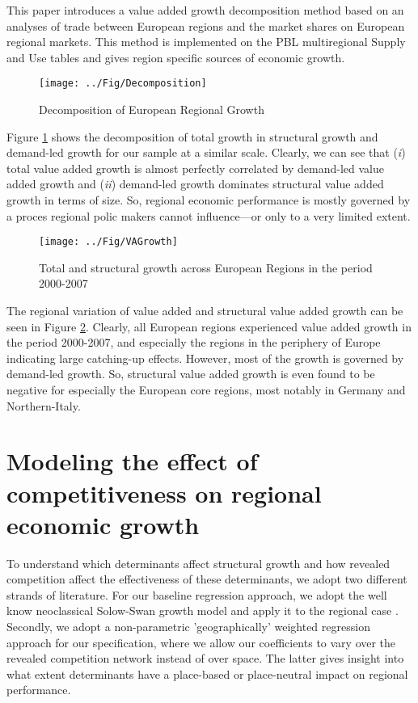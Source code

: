 \documentclass[11pt,parskip,abstracton,notitlepage, paper=a4]{scrartcl}
\begin{document}
This paper introduces a value added growth decomposition method based on an analyses of trade between European regions and the market shares on European regional markets. This method is implemented on the PBL multiregional Supply and Use tables \citep{Thissen2013b, Thissen2013} and gives region specific sources of economic growth. 

\begin{figure}
	\texttt{[image: ../Fig/Decomposition]}
	\caption{Decomposition of European Regional Growth}
	\label{fig:decomposition}
\end{figure}

Figure \ref{fig:decomposition} shows the decomposition of total growth in structural growth and demand-led growth for our sample at a similar scale. Clearly, we can see that (\textit{i}) total value added growth is almost perfectly correlated by demand-led value added growth and (\textit{ii}) demand-led growth dominates structural value added growth in terms of size. So, regional economic performance is mostly governed by a proces regional polic makers cannot influence---or only to a very limited extent. 

\begin{figure}
	\texttt{[image: ../Fig/VAGrowth]}
	\caption{Total and structural growth across European Regions in the period 2000-2007}
	\label{fig:mapsgrowth}
\end{figure}

The regional variation of value added and structural value added growth can be seen in Figure \ref{fig:mapsgrowth}. Clearly, all European regions experienced value added growth in the period 2000-2007, and especially the regions in the periphery of Europe indicating large catching-up effects. However, most of the growth is governed by demand-led growth. So, structural value added growth is even found to be negative for especially the European core regions, most notably in Germany and Northern-Italy.

\section{Modeling the effect of competitiveness on regional economic growth\label{sec:model}}

To understand which determinants affect structural growth and how revealed competition affect the effectiveness of these determinants, we adopt two different strands of literature. For our baseline regression approach, we adopt the well know neoclassical Solow-Swan growth model \citep{MANKIW1992} and apply it to the regional case \citep[conform, e.g.,][]{ABREU2005}. Secondly, we adopt a non-parametric 'geographically' weighted regression approach \citep{brunsdon1998geographically} for our specification, where we allow our coefficients to vary over the revealed competition network instead of over space. The latter gives insight into what extent determinants have a place-based or place-neutral impact on regional performance.  
\end{document}
